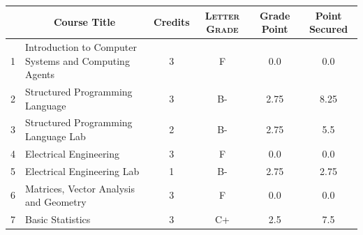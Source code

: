 \documentclass[11pt]{article}
\newcommand*{\numtwo}[1]{\pgfmathprintnumber[
                    fixed, precision=2, fixed zerofill=true]{#1}}
\begin{document}
                \begin{center}
                    \renewcommand{\arraystretch}{1.08}
                    
                \begin{tabular}{|c|l|c|>{\scshape}c|c|c|}
                \hline  \rule[-1ex]{0pt}{3.5ex} {\centering{\bf Course Code}} &  \multicolumn{1}{c|}{\textbf{Course Title}}  & {\bf Credits} & {\bf Letter Grade} & {\bf Grade Point} & {\bf Point Secured}  \\ 
                \hline   1 &  Introduction to Computer Systems and Computing Agents		 & 3 & F & 0.0 & 0.0 \\ %
                \hline   2 &  Structured Programming Language		 & 3 & B- & 2.75 & 8.25 \\ %
                \hline   3 &  Structured Programming Language Lab		 & 2 & B- & 2.75 & 5.5 \\ %
                \hline   4 &  Electrical Engineering		 & 3 & F & 0.0 & 0.0 \\ %
                \hline   5 &  Electrical Engineering Lab		 & 1 & B- & 2.75 & 2.75 \\ %
                \hline   6 &  Matrices, Vector Analysis and Geometry		 & 3 & F & 0.0 & 0.0 \\ %
                \hline   7 &  Basic Statistics		 & 3 & C+ & 2.5 & 7.5 \\ %

\hline                %
                \end{tabular}
                \end{center}
                \renewcommand{\arraystretch}{1.03}
\end{document}
